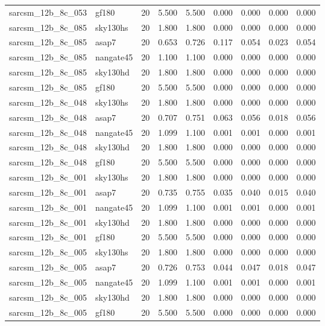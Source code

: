 \begin{tabular}{llrrrrrrr}
sarcsm\_12b\_8c\_053 & gf180 & 20 & 5.500 & 5.500 & 0.000 & 0.000 & 0.000 & 0.000 \\
sarcsm\_12b\_8c\_085 & sky130hs & 20 & 1.800 & 1.800 & 0.000 & 0.000 & 0.000 & 0.000 \\
sarcsm\_12b\_8c\_085 & asap7 & 20 & 0.653 & 0.726 & 0.117 & 0.054 & 0.023 & 0.054 \\
sarcsm\_12b\_8c\_085 & nangate45 & 20 & 1.100 & 1.100 & 0.000 & 0.000 & 0.000 & 0.000 \\
sarcsm\_12b\_8c\_085 & sky130hd & 20 & 1.800 & 1.800 & 0.000 & 0.000 & 0.000 & 0.000 \\
sarcsm\_12b\_8c\_085 & gf180 & 20 & 5.500 & 5.500 & 0.000 & 0.000 & 0.000 & 0.000 \\
sarcsm\_12b\_8c\_048 & sky130hs & 20 & 1.800 & 1.800 & 0.000 & 0.000 & 0.000 & 0.000 \\
sarcsm\_12b\_8c\_048 & asap7 & 20 & 0.707 & 0.751 & 0.063 & 0.056 & 0.018 & 0.056 \\
sarcsm\_12b\_8c\_048 & nangate45 & 20 & 1.099 & 1.100 & 0.001 & 0.001 & 0.000 & 0.001 \\
sarcsm\_12b\_8c\_048 & sky130hd & 20 & 1.800 & 1.800 & 0.000 & 0.000 & 0.000 & 0.000 \\
sarcsm\_12b\_8c\_048 & gf180 & 20 & 5.500 & 5.500 & 0.000 & 0.000 & 0.000 & 0.000 \\
sarcsm\_12b\_8c\_001 & sky130hs & 20 & 1.800 & 1.800 & 0.000 & 0.000 & 0.000 & 0.000 \\
sarcsm\_12b\_8c\_001 & asap7 & 20 & 0.735 & 0.755 & 0.035 & 0.040 & 0.015 & 0.040 \\
sarcsm\_12b\_8c\_001 & nangate45 & 20 & 1.099 & 1.100 & 0.001 & 0.001 & 0.000 & 0.001 \\
sarcsm\_12b\_8c\_001 & sky130hd & 20 & 1.800 & 1.800 & 0.000 & 0.000 & 0.000 & 0.000 \\
sarcsm\_12b\_8c\_001 & gf180 & 20 & 5.500 & 5.500 & 0.000 & 0.000 & 0.000 & 0.000 \\
sarcsm\_12b\_8c\_005 & sky130hs & 20 & 1.800 & 1.800 & 0.000 & 0.000 & 0.000 & 0.000 \\
sarcsm\_12b\_8c\_005 & asap7 & 20 & 0.726 & 0.753 & 0.044 & 0.047 & 0.018 & 0.047 \\
sarcsm\_12b\_8c\_005 & nangate45 & 20 & 1.099 & 1.100 & 0.001 & 0.001 & 0.000 & 0.001 \\
sarcsm\_12b\_8c\_005 & sky130hd & 20 & 1.800 & 1.800 & 0.000 & 0.000 & 0.000 & 0.000 \\
sarcsm\_12b\_8c\_005 & gf180 & 20 & 5.500 & 5.500 & 0.000 & 0.000 & 0.000 & 0.000 \\

\end{tabular}
